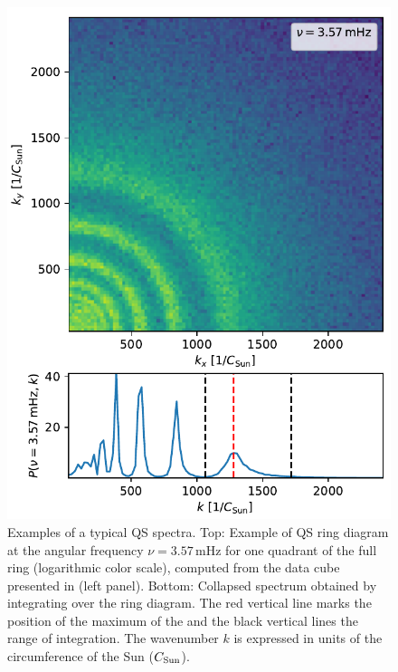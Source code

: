 \documentclass{aa}
\begin{document}
\begin{figure}\centering
        \includegraphics[width=1.0\linewidth]{ring_diagram_spectrum}
        \caption{
        Examples of a typical QS \fff spectra.
        Top: Example of QS ring diagram at
        the angular frequency 
        $\nu=3.57$\,mHz 
        for one quadrant of the full ring (logarithmic color scale), computed from the data cube presented in  (left panel). 
        Bottom: Collapsed spectrum obtained by 
        integrating over
        the ring diagram. The red vertical line marks the position of the maximum of the \fff and the black vertical lines the range of integration. The wavenumber $k$ is expressed in units of the circumference of the Sun ($C_{\rm Sun}$).}
        \label{ring_diagram}
\end{figure}
\end{document}
